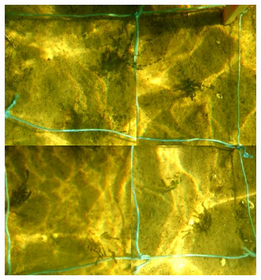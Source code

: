 \documentclass[xcolor=dvipsnames]{beamer}
\begin{document}
\begin{frame}
\begin{columns}
\begin{column}{6cm}
\begin{overprint}
\begin{figure}
\includegraphics[width=\textwidth]{images/Fotos/vvonoben.jpg}
\end{figure}
\end{overprint}
\end{column}
\end{columns}
\end{frame}
\end{document}
